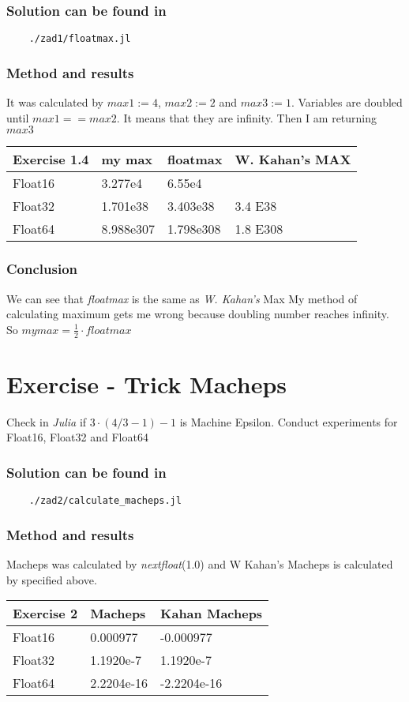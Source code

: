 \documentclass[12pt]{article}
\begin{document}
\subsubsection*{Solution can be found in}
\begin{verbatim}
    ./zad1/floatmax.jl
\end{verbatim}
\subsubsection*{Method and results}
It was calculated by $max1 := 4$, $max2 := 2$ and $max3:=1$. 
Variables are doubled until $max1 == max2$. It means that they are infinity. 
Then I am returning $max3$ 
\begin{table}[!ht]
    \centering
    \begin{tabular}{|l|l|l|l|}
    \hline
        Exercise 1.4 & my max & floatmax & W. Kahan's MAX \\ \hline
        Float16 & 3.277e4 & 6.55e4 & ~ \\ \hline
        Float32 & 1.701e38 & 3.403e38 & 3.4 E38 \\ \hline
        Float64 & 8.988e307 & 1.798e308 & 1.8 E308 \\ \hline
    \end{tabular}
\end{table}
\subsubsection*{Conclusion}
We can see that \emph{floatmax} is the same as \emph{W. Kahan's} Max \newline
My method of calculating maximum gets me wrong because doubling number reaches infinity. 
So $my max = \frac{1}{2} \cdot floatmax$
\section{Exercise - Trick Macheps}
Check in \emph{Julia} if $3\cdot(4/3-1)-1$ is Machine Epsilon. Conduct experiments for Float16, Float32 and Float64
\subsubsection*{Solution can be found in}
\begin{verbatim}
    ./zad2/calculate_macheps.jl
\end{verbatim}
\subsubsection*{Method and results}
Macheps was calculated by \emph{nextfloat}(1.0) and W Kahan's Macheps is calculated by specified above.
\begin{table}[!ht]
    \centering
    \begin{tabular}{|l|l|l|}
    \hline
        Exercise 2 & Macheps & Kahan Macheps \\ \hline
        Float16 & 0.000977 & -0.000977 \\ \hline
        Float32 & 1.1920e-7 & 1.1920e-7 \\ \hline
        Float64 & 2.2204e-16 & -2.2204e-16 \\ \hline
    \end{tabular}
\end{table}
\end{document}
